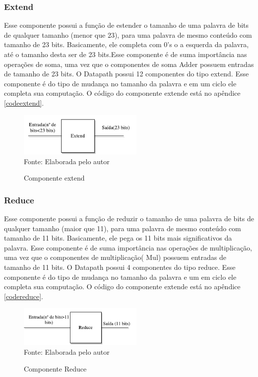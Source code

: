 \subsubsection{Extend}
Esse componente possui a função de estender o tamanho de uma palavra de bits de qualquer tamanho (menor que 23), para uma palavra de mesmo conteúdo com tamanho de 23 bits. Basicamente, ele completa com 0's o a esquerda da palavra, até o tamanho desta ser de 23 bits.Esse componente é de suma importância nas operações de soma, uma vez que o componentes de soma Adder  possuem entradas de tamanho de 23 bits. O Datapath possui 12 componentes do tipo extend. Esse componente é do tipo de mudança no tamanho da palavra e em um ciclo ele completa sua computação. O código do componente extende está no apêndice \ref{codeextend}.


\begin{figure}[H]
	\centering
	\caption{Componente extend}
	\includegraphics[width=6cm]{figures/Extend.pdf}\\
	
	{Fonte: Elaborada pelo autor}
	\label{extend}
\end{figure}


\subsubsection{Reduce}
Esse componente possui a função de reduzir o tamanho de uma palavra de bits de qualquer tamanho (maior que 11), para uma palavra de mesmo conteúdo com tamanho de 11 bits. Basicamente, ele pega os 11 bits mais significativos da palavra. Esse componente é de suma importância nas operações de multiplicação, uma vez que o componentes de multiplicação( Mul) possuem entradas de tamanho de 11 bits. O Datapath possui 4 componentes do tipo reduce. Esse componente é do tipo de mudança no tamanho da palavra e um em ciclo ele completa sua computação. O código do componente extende está no apêndice \ref{codereduce}.


\begin{figure}[H]
	\centering
	\caption{Componente Reduce}
	\includegraphics[width=6cm]{figures/Reduce.pdf}\\
	
	{Fonte: Elaborada pelo autor}
	\label{reduce}
\end{figure}


